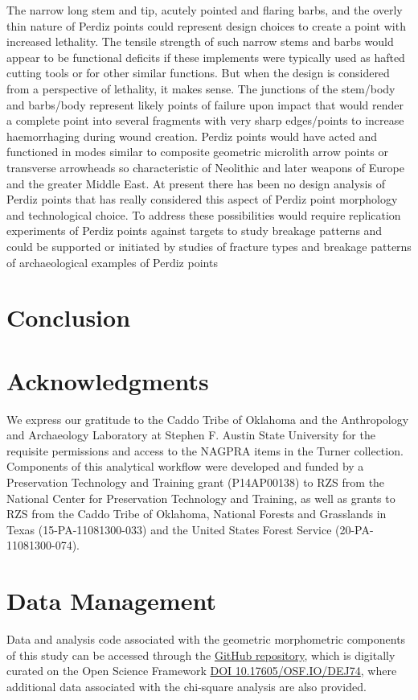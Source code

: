 \documentclass[review]{elsarticle}
\begin{document}
The narrow long stem and tip, acutely pointed and flaring barbs, and the overly thin nature of Perdiz points could represent design choices to create a point with increased lethality. The tensile strength of such narrow stems and barbs would appear to be functional deficits if these implements were typically used as hafted cutting tools or for other similar functions.  But when the design is considered from a perspective of lethality, it makes sense. The junctions of the stem/body and barbs/body represent likely points of failure upon impact that would render a complete point into several fragments with very sharp edges/points to increase haemorrhaging during wound creation.  Perdiz points would have acted and functioned in modes similar to composite geometric microlith arrow points or transverse arrowheads so characteristic of Neolithic and later weapons of Europe and the greater Middle East. At present there has been no design analysis of Perdiz points that has really considered this aspect of Perdiz point morphology and technological choice. To address these possibilities would require replication experiments of Perdiz points against targets to study breakage patterns and could be supported or initiated by studies of fracture types and breakage patterns of archaeological examples of Perdiz points

\section*{Conclusion}



\section*{Acknowledgments}

We express our gratitude to the Caddo Tribe of Oklahoma and the Anthropology and Archaeology Laboratory at Stephen F. Austin State University for the requisite permissions and access to the NAGPRA items in the Turner collection. Components of this analytical workflow were developed and funded by a Preservation Technology and Training grant (P14AP00138) to RZS from the National Center for Preservation Technology and Training, as well as grants to RZS from the Caddo Tribe of Oklahoma, National Forests and Grasslands in Texas (15-PA-11081300-033) and the United States Forest Service (20-PA-11081300-074).

\section*{Data Management}

Data and analysis code associated with the geometric morphometric components of this study can be accessed through the \href{https://github.com/aksel-blaise/perdiz}{GitHub repository}, which is digitally curated on the Open Science Framework \href{https://osf.io/dej74/}{DOI 10.17605/OSF.IO/DEJ74}, where additional data associated with the chi-square analysis are also provided.

\newpage

\end{document}
